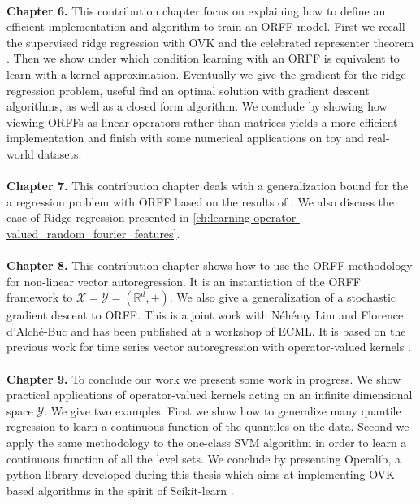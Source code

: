 \paragraph{}
\textbf{Chapter 6.}
This contribution chapter focus on explaining how to define an efficient
implementation and algorithm to train an \acs{ORFF} model. First we recall
the supervised ridge regression with \acs{OVK} and the celebrated representer
theorem \citep{Wahba90}. Then we show under which condition learning with an
\acs{ORFF} is equivalent to learn with a kernel approximation. Eventually
we give the gradient for the ridge regression problem, useful find an optimal
solution with gradient descent algorithms, as well as a closed form algorithm.
We conclude by showing how viewing \acsp{ORFF} as linear operators rather than 
matrices yields a more efficient implementation and finish with some numerical
applications on toy and real-world datasets.

\paragraph{}
\textbf{Chapter 7.}
This contribution chapter deals with a generalization bound for the a
regression problem with ORFF based on the results of \citet{rahimi2009weighted,
maurer2016vector}.  We also discuss the case of Ridge regression presented in
\cref{ch:learning operator-valued_random_fourier_features}.

\paragraph{}
\textbf{Chapter 8.}
This contribution chapter shows how to use the \acs{ORFF} methodology for
non-linear vector autoregression. It is an instantiation of the \acs{ORFF}
framework to $\mathcal{X}=\mathcal{Y}=(\mathbb{R}^d, +)$. We also give a
generalization of a stochastic gradient descent \citep{dai2014scalable} to
\acs{ORFF}. This is a joint work with N\'eh\'emy Lim and Florence d'Alch\'e-Buc
and has been published at a workshop of \acs{ECML}. It is based on the previous
work \citet{Lim2015} for time series vector autoregression with operator-valued
kernels \cite{brault2016scaling}.

\paragraph{}
\textbf{Chapter 9.}
To conclude our work we present some work in progress. We show practical
applications of operator-valued kernels acting on an infinite dimensional space
$\mathcal{Y}$. We give two examples. First we show how to generalize many
quantile regression to learn a continuous function of the quantiles on the
data. Second we apply the same methodology to the one-class SVM algorithm in
order to learn a continuous function of all the level sets. We conclude by
presenting Operalib, a python library developed during this thesis which aims
at implementing \acs{OVK}-based algorithms in the spirit of Scikit-learn
\citep{pedregosa2011scikit}.


